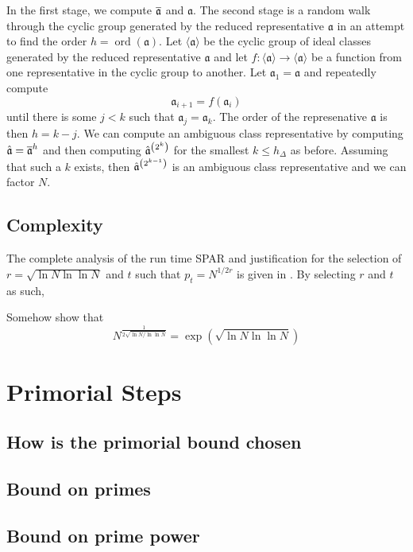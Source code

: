 \documentclass{ucalgthes1}
\theoremstyle{plain}
\theoremstyle{definition}
\DeclareMathOperator{\ord}{ord}
\begin{document}
In the first stage, we compute $\overline{\mathfrak a}$ and $\mathfrak a$.  The second stage is a random walk through the cyclic group generated by the reduced representative $\mathfrak a$ in an attempt to find the order $h = \ord(\mathfrak a)$.  Let $\langle \mathfrak a \rangle$ be the cyclic group of ideal classes generated by the reduced representative $\mathfrak a$ and let $f : \langle \mathfrak a \rangle \rightarrow \langle \mathfrak a \rangle$ be a function from one representative in the cyclic group to another.  Let $\mathfrak a_1 = \mathfrak a$ and repeatedly compute
\[
	\mathfrak a_{i+1} = f(\mathfrak a_i)
\]
until there is some $j < k$ such that $\mathfrak a_j = \mathfrak a_k$.  The order of the represenative $\mathfrak a$ is then $h = k - j$.  We can compute an ambiguous class representative by computing $\hat{\mathfrak a} = \overline{\mathfrak a}^h$ and then computing ${\hat{\mathfrak a}}^{\left(2^k\right)}$ for the smallest $k \le h_\Delta$ as before.  Assuming that such a $k$ exists, then ${\hat{\mathfrak a}}^{\left(2^{k-1}\right)}$ is an ambiguous class representative and we can factor $N$.

\subsection{Complexity}

The complete analysis of the run time SPAR and justification for the selection of $r = \sqrt{\ln N \ln \ln N}$ and $t$ such that $p_t = N^{1/2r}$ is given in \cite{Schnorr1984}.  By selecting $r$ and $t$ as such, 


Somehow show that
\[
	N ^ { \frac{1}{2 \sqrt{ \ln N / \ln \ln N }} } = \exp\left({\sqrt{\ln N \ln \ln N}}\right)
\]


\section{Primorial Steps}

\subsection{How is the primorial bound chosen}

\subsection{Bound on primes}

\subsection{Bound on prime power}
\end{document}
